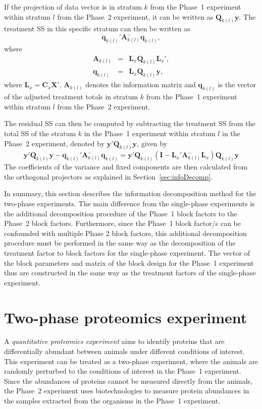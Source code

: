 \documentclass[article]{jss}
\newcommand{\I}{\mathbf{I}}
\newcommand{\X}{\mathbf{X}}
\newcommand{\Q}{\mathbf{Q}}
\newcommand{\A}{\mathbf{A}}
\newcommand{\C}{\mathbf{C}}
\newcommand{\mL}{\mathbf{L}}
\begin{document}
If the projection of data vector is in stratum $k$ from the Phase~1 experiment within stratum $l$ from the Phase~2 experiment, it can be written as $\Q_{k(l)} \bm{y}$. The treatment SS in this specific stratum can then be written as
\[
\bm{q}_{k(l)}' \A_{k(l)}^{-} \bm{q}_{k(l)},
\]
where
\begin{eqnarray*}
\A_{k(l)} &=& \mL_{x}\Q_{k(l)}\mL_{x}',\\
\bm{q}_{k(l)} &=& \mL_{x}\Q_{k(l)} \bm{y},
\end{eqnarray*}
where $\mL_{x} = \C_x \X'$, $\A_{k(l)}$ denotes the information matrix and $\bm{q}_{k(l)}$ is the vector of the adjusted treatment totals in stratum $k$ from the Phase~1 experiment within stratum $l$ from the Phase~2 experiment.

The residual SS can then be computed by subtracting the treatment SS from the total SS of the stratum $k$ in the Phase~1 experiment within stratum $l$ in the Phase~2 experiment, denoted by $\bm{y}' \Q_{k(l)} \bm{y}$, given by
\[
\bm{y}' \Q_{k(l)} \bm{y} - \bm{q}_{k(l)}' \A_{k(l)}^{-} \bm{q}_{k(l)} = \bm{y}'\Q_{k(l)}( \I - \mL_{x}' \A_{k(l)}^{-} \mL_{x}) \Q_{k(l)}\bm{y}
\]
The coefficients of the variance and fixed components are then calculated from the orthogonal projectors as explained in Section~\ref{sec:infoDecomp}.

In summary, this section describes the information decomposition method for the two-phase experiments. The main difference from the single-phase experiments is the additional decomposition procedure of the Phase~1 block factors to the Phase~2 block factors. Furthermore, since the Phase~1 block factor/s can be confounded with multiple Phase 2 block factors, this additional decomposition procedure must be performed in the same way as the decomposition of the treatment factor to block factors for the single-phase experiment. The vector of the block parameters and matrix of the block design for the Phase~1 experiment thus are constructed in the same way as the treatment factors of the single-phase experiment.  

\section{Two-phase proteomics experiment} 
\label{sec:exampleTwoPase}
A \emph{quantitative proteomics experiment} aims to identify proteins that are differentially abundant between animals under different conditions of interest. This experiment can be treated as a two-phase experiment, where the animals are randomly perturbed to the conditions of interest in the Phase~1 experiment. Since the abundances of proteins cannot be measured directly from the animals, the Phase~2 experiment uses biotechnologies to measure protein abundances in the samples extracted from the organisms in the Phase~1 experiment.
\end{document}
